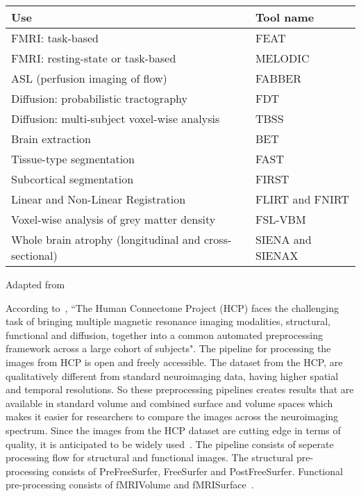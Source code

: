 \begin{center}
\tabulinesep=1.2mm
\begin{tabu} to \textwidth { | X[l] | X[l] | }
  \hline
  Use & Tool name \\
  \hline
  FMRI: task-based & FEAT \\
  \hline
  FMRI: resting-state or task-based & MELODIC \\
  \hline
  ASL (perfusion imaging of flow) & FABBER \\
  \hline
  Diffusion: probabilistic tractography & FDT \\
  \hline
  Diffusion: multi-subject voxel-wise analysis & TBSS \\
  \hline
  Brain extraction & BET \\
  \hline
  Tissue-type segmentation  & FAST \\
  \hline
  Subcortical segmentation & FIRST \\
  \hline
  Linear and Non-Linear Registration & FLIRT and FNIRT \\
  \hline
  Voxel-wise analysis of grey matter density & FSL-VBM \\
  \hline
  Whole brain atrophy (longitudinal and cross-sectional) & SIENA and SIENAX \\
  \hline
\end{tabu}
\label{tab:tools_fsl}
\caption*{Adapted from \cite{JENKINSON2012782}}
\end{center}

According to~\cite{Gla13}, ``The Human Connectome Project (HCP) faces the challenging task of bringing multiple magnetic resonance imaging modalities, structural, functional and diffusion, together into a common automated preprocessing framework across a large cohort of subjects". The pipeline for processing the images from HCP is open and freely accessible. The dataset from the HCP, are qualitatively different from standard neuroimaging data, having higher spatial and temporal resolutions. So these preprocessing pipelines creates results that are available in standard volume and combined surface and volume spaces which makes it easier for researchers to compare the images across the neuroimaging spectrum. Since the images from the HCP dataset are cutting edge in terms of quality, it is anticipated to be widely used~\cite{HODGE20161102}. The pipeline consists of seperate processing flow for structural and functional images. The structural pre-processing consists of PreFreeSurfer, FreeSurfer and PostFreeSurfer. Functional pre-processing consists of fMRIVolume and fMRISurface~\cite{FSL}.

